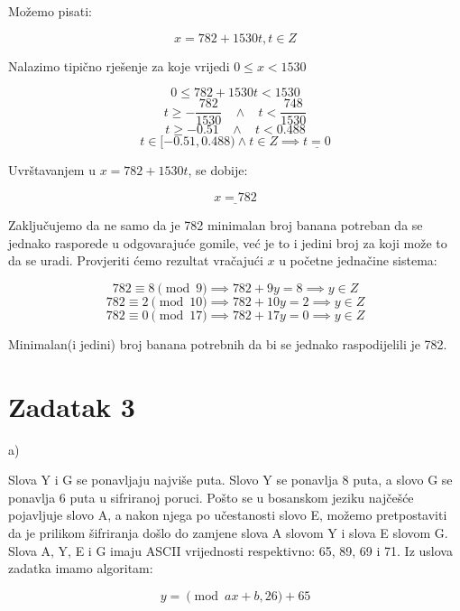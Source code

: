 \documentclass[12pt]{article}
\begin{document}
Možemo pisati:

$$x = 782 + 1530t, t\in Z$$\vspace{1mm}

Nalazimo tipično rješenje za koje vrijedi $0 \leq x < 1530$

$$0 \leq 782 + 1530t < 1530$$\vspace{1mm}
$$t \geq - \frac{782}{1530} \>\>\>\> \land \>\>\>\> t < \frac{748}{1530}$$\vspace{1mm}
$$t \geq - 0.51 \>\>\>\> \land \>\>\>\> t < 0.488$$\vspace{1mm}
$$t\in [-0.51, 0.488) \land t \in Z \implies \underline{t = 0}$$\vspace{1mm}

Uvrštavanjem u $x = 782 + 1530t$, se dobije:

$$\underline{x = 782}$$\vspace{1mm}

Zaključujemo da ne samo da je 782 minimalan broj banana potreban da se jednako rasporede u odgovarajuće gomile, već je to i jedini broj za koji može to da se uradi. Provjeriti ćemo rezultat vračajući $x$ u početne jednačine sistema:

$$782 \equiv 8 \pmod{9} \implies 782 + 9y = 8 \implies y \in Z$$
$$782 \equiv 2 \pmod{10} \implies 782 + 10y = 2 \implies y \in Z$$
$$782 \equiv 0 \pmod{17} \implies 782 + 17y = 0 \implies y \in Z$$\vspace{1mm}

Minimalan(i jedini) broj banana potrebnih da bi se jednako raspodijelili je 782.

\newpage

\section*{Zadatak 3\label{Z3}}

a)

\hspace{0.65cm}Slova Y i G se ponavljaju najviše puta. Slovo Y se ponavlja 8 puta, a slovo G se ponavlja 6 puta u sifriranoj poruci. Pošto se u bosanskom jeziku najčešće pojavljuje slovo A, a nakon njega po učestanosti slovo E, možemo pretpostaviti da je prilikom šifriranja došlo do zamjene slova A slovom Y i slova E slovom G. Slova A, Y, E i G imaju ASCII vrijednosti respektivno: 65, 89, 69 i 71. Iz uslova zadatka imamo algoritam:

$$y = \pmod{ax + b, 26} + 65$$\vspace{1mm}
\end{document}
